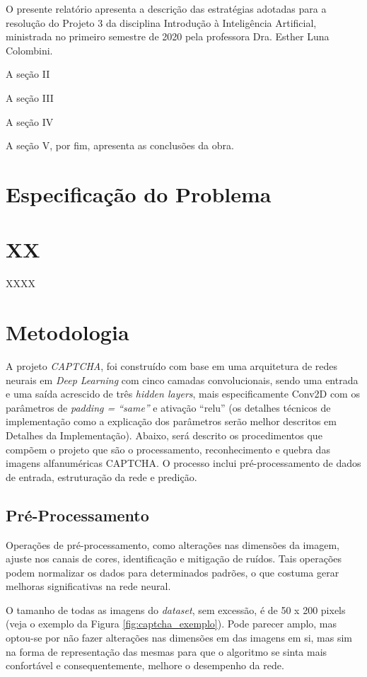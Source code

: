 \documentclass[twoside,conference,a4paper]{IEEEtran}
\begin{document}
O presente relatório apresenta a descrição das estratégias adotadas para a resolução do Projeto 3 da disciplina Introdução à Inteligência Artificial, ministrada no primeiro semestre de 2020 pela professora Dra. Esther Luna Colombini.


A seção II 

A seção III 

A seção IV 

A seção V, por fim, apresenta as conclusões da obra.

\section{Especificação do Problema}


\section{XX}

XXXX

\section{Metodologia}
A projeto \textit{CAPTCHA}, foi construído com base em uma arquitetura de redes neurais em \textit{Deep Learning} com cinco camadas convolucionais, sendo uma entrada e uma saída acrescido de três \textit{hidden layers}, mais especificamente Conv2D com os parâmetros de \textit{padding = ``same''} e ativação ``relu'' (os detalhes técnicos de implementação como a explicação dos parâmetros serão melhor descritos em Detalhes da Implementação). Abaixo, será descrito os procedimentos que compõem o projeto que são o processamento, reconhecimento e quebra das imagens alfanuméricas CAPTCHA. O processo inclui pré-processamento de dados de entrada, estruturação da rede e predição.

\subsection{Pré-Processamento}

Operações de pré-processamento, como alterações nas dimensões da imagem, ajuste nos canais de cores, identificação e mitigação de ruídos. Tais operações podem normalizar os dados para determinados padrões, o que costuma gerar melhoras significativas na rede neural.

O tamanho de todas as imagens do \textit{dataset}, sem excessão, é de 50 x 200 pixels (veja o exemplo da Figura \ref{fig:captcha_exemplo}). Pode parecer amplo, mas optou-se por não fazer alterações nas dimensões em das imagens em si, mas sim na forma de representação das mesmas para que o algoritmo se sinta mais confortável e consequentemente, melhore o desempenho da rede.
\end{document}
